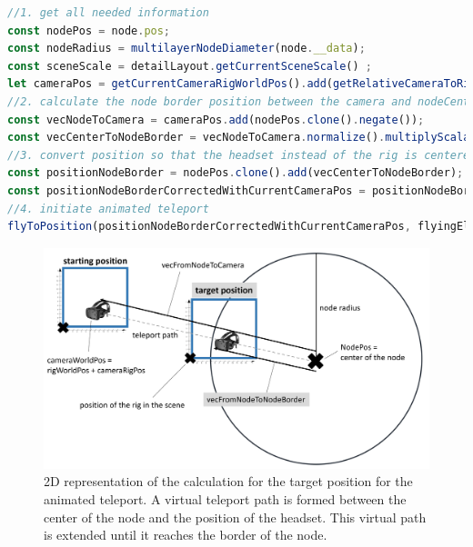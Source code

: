 \begin{lstlisting}[language=JavaScript,label={lst:calculationFlyToNode},caption=Matrix calculations for determining the target position of the animated teleport.]
//1. get all needed information
const nodePos = node.pos;
const nodeRadius = multilayerNodeDiameter(node.__data);
const sceneScale = detailLayout.getCurrentSceneScale() ;
let cameraPos = getCurrentCameraRigWorldPos().add(getRelativeCameraToRigPos());
//2. calculate the node border position between the camera and nodeCenter
const vecNodeToCamera = cameraPos.add(nodePos.clone().negate());
const vecCenterToNodeBorder = vecNodeToCamera.normalize().multiplyScalar(nodeRadius*0.95*sceneScale);//*0.95 as we want to be slightly inside the selected node
//3. convert position so that the headset instead of the rig is centered
const positionNodeBorder = nodePos.clone().add(vecCenterToNodeBorder);
const positionNodeBorderCorrectedWithCurrentCameraPos = positionNodeBorder.clone().add(getRelativeCameraToRigPos().negate());
//4. initiate animated teleport
flyToPosition(positionNodeBorderCorrectedWithCurrentCameraPos, flyingElement);
\end{lstlisting}
\pagebreak

\begin{figure}[h]
    \centering
    \includegraphics[width=1\textwidth]{graphics/flyToNodePositionCalc.jpg}
    \caption[2D representation of the calculation for the target position for the animated teleport.]{2D representation of the calculation for the target position for the animated teleport. A virtual teleport path is formed between the center of the node and the position of the headset. This virtual path is extended until it reaches the border of the node.} 
    \label{fig:vrFlyToNode} 
\end{figure}

